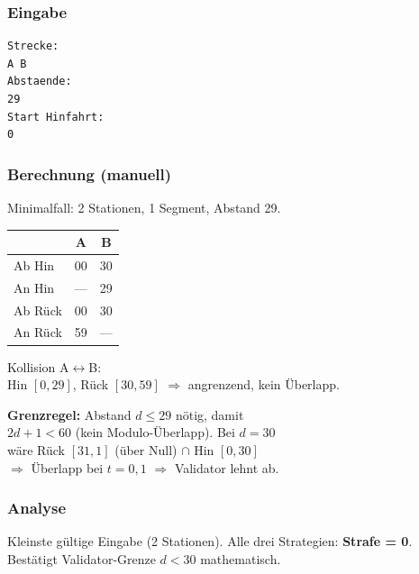 \documentclass[12pt,a4paper]{article}
\begin{document}
\noindent
\begin{minipage}[t]{0.48\textwidth}
\scriptsize
\setlength{\tabcolsep}{2pt}

\subsubsection*{Eingabe}
\begin{lstlisting}
Strecke:
A B
Abstaende:
29
Start Hinfahrt:
0
\end{lstlisting}

\subsubsection*{Berechnung (manuell)}
Minimalfall: 2 Stationen, 1 Segment, Abstand 29.\\[2pt]
\begin{tabular}{l|cc}
\toprule
 & \textbf{A} & \textbf{B}\\
\midrule
Ab Hin  & 00 & 30\\
An Hin  & —  & 29\\
Ab Rück & 00 & 30\\
An Rück & 59 & —\\
\bottomrule
\end{tabular}

\vspace{4pt}
Kollision A$\leftrightarrow$B:\\
Hin $[0,29]$, Rück $[30,59]$ $\Rightarrow$ angrenzend, kein Überlapp.

\vspace{4pt}
\textbf{Grenzregel:} Abstand $d \leq 29$ nötig, damit\\
$2d+1 < 60$ (kein Modulo-Überlapp). Bei $d=30$\\
wäre Rück $[31,1]$ (über Null) $\cap$ Hin $[0,30]$\\
$\Rightarrow$ Überlapp bei $t=0,1$ $\Rightarrow$ Validator lehnt ab.

\subsubsection*{Analyse}
Kleinste gültige Eingabe (2 Stationen).
Alle drei Strategien: \textbf{Strafe = 0}.
Bestätigt Validator-Grenze $d < 30$ mathematisch.
\end{minipage}
\hfill
\end{document}
